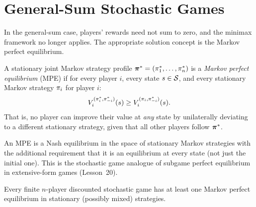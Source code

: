 \documentclass[11pt,a4paper]{article}
\begin{document}
\section{General-Sum Stochastic Games}
\label{sec:general-sum}

In the general-sum case, players' rewards need not sum to zero, and
the minimax framework no longer applies.  The appropriate solution
concept is the Markov perfect equilibrium.

\begin{definition}
\label{def:mpe}
A stationary joint Markov strategy profile
$\boldsymbol{\pi}^* = (\pi_1^*, \ldots, \pi_n^*)$ is a
\emph{Markov perfect equilibrium} (MPE) if for every player $i$,
every state $s \in \mathcal{S}$, and every stationary Markov strategy
$\pi_i$ for player $i$:
\begin{equation}
\label{eq:mpe-condition}
  V_i^{(\pi_i^*, \pi_{-i}^*)}(s)
  \geq V_i^{(\pi_i, \pi_{-i}^*)}(s).
\end{equation}
That is, no player can improve their value at \emph{any} state by
unilaterally deviating to a different stationary strategy, given that
all other players follow $\boldsymbol{\pi}^*$.
\end{definition}

\begin{remark}
An MPE is a Nash equilibrium in the space of stationary Markov
strategies with the additional requirement that it is an equilibrium
at every state (not just the initial one).  This is the stochastic
game analogue of subgame perfect equilibrium in extensive-form games
(Lesson~20).
\end{remark}

\begin{theorem}
\label{thm:fink}
Every finite $n$-player discounted stochastic game has at least one
Markov perfect equilibrium in stationary (possibly mixed) strategies.
\end{theorem}
\end{document}
